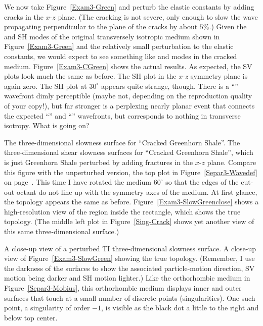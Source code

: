 We now take Figure~\ref{Exam3-Green} and perturb the elastic constants
by adding cracks in the $x$-$z$ plane. (The cracking is not severe,
only enough to slow the {\qSV} wave propagating
perpendicular to the plane of the cracks by about $5\%$.)
Given the {\qSV} and SH modes of the
original transversely isotropic medium shown in Figure~\ref{Exam3-Green}
and the relatively small perturbation to the elastic constants,
we would expect to see something like {\qSV} and {\qSH} modes
in the cracked medium.
Figure~\ref{Exam3-CGreen} shows the actual results.
As expected, the SV plots look much the same as before.
The SH plot in the $x$-$z$ symmetry plane is again zero.
The SH plot at $30^\circ$ appears quite strange, though.
There is a ``{\qSH}'' wavefront dimly perceptible (maybe not,
depending on the reproduction quality of your copy!),
but far stronger is a perplexing nearly planar event
that connects the expected ``{\qSV}'' and ``{\qSH}'' wavefronts,
but corresponds to nothing in transverse isotropy.
What is going on?

{The three-dimensional slowness surface for ``Cracked Greenhorn Shale''.}
{
The three-dimensional shear slowness surfaces for ``Cracked Greenhorn Shale'',
which is just Greenhorn Shale perturbed by adding fractures
in the $x$-$z$ plane.
Compare this figure with the unperturbed version, the top plot
in Figure~\protect\ref{Separ3-Wavedef}
on page~\protect\pageref{Separ3-Wavedef}.
This time I have rotated the medium $60^\circ$ so that the edges of
the cut-out octant do not line up with the symmetry axes of the medium.
At first glance, the topology appears the same as before.
Figure~\protect\ref{Exam3-SlowGreenclose} shows
a high-resolution view of the region inside the rectangle,
which shows the true topology.
(The middle left plot in Figure~\protect\ref{Sing-Crack} shows yet
another view of this same three-dimensional surface.)
}

{A close-up view of a perturbed TI three-dimensional slowness surface.}
{
A close-up view of Figure~\protect\ref{Exam3-SlowGreen} showing the
true topology. (Remember, I use the darkness of the surfaces
to show the associated particle-motion direction,
SV motion being darker and SH motion lighter.)
Like the orthorhombic medium in Figure~\protect\ref{Separ3-Mobius},
this orthorhombic medium displays inner {} and outer {}
surfaces that touch at a small number of discrete points (singularities).
One such point, a singularity of order $-1$, is visible as the black dot
a little to the right and below top center.
}

